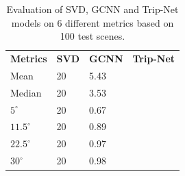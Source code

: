 \documentclass[border=15pt, multi, tikz]{article}
\newcommand{\tabhead}[1]{\textbf{#1}}
\begin{document}
\begin{table}[H]
	\centering
	\begin{tabular}{l l l l }
		\tabhead{Metrics} & \tabhead{SVD} & \tabhead{GCNN} & \tabhead{Trip-Net} \\
		Mean  					& 20 & 5.43 & \\ 
		\hline
		Median					& 20 & 3.53 & \\ 
		\hline
		$ 5^\circ $ 			& 20 & 0.67 & \\
		\hline
		$ 11.5^\circ $ 			& 20 & 0.89 & \\
		\hline
		$ 22.5^\circ $ 			& 20 & 0.97 & \\
		\hline
		$ 30^\circ $ 			& 20 & 0.98 & \\
	\end{tabular}
	\caption{Evaluation of SVD, GCNN and Trip-Net models on 6 different metrics based on 100 test scenes.}	
	\label{tab:high_resolution_eval}
\end{table}
\end{document}
